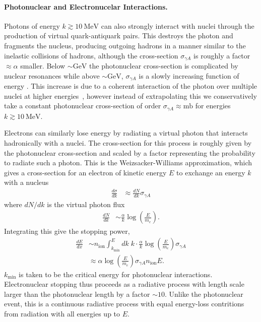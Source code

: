 \documentclass[twocolumn, preprintnumbers,amsmath,amssymb,prd, superscriptaddress]{revtex4}
\newcommand{\GeV}{\text{GeV}}
\def\r{\right)}
\def\l{\left(}
\begin{document}
\begin{appendices}
\paragraph{Photonuclear and Electronucelar Interactions.}
Photons of energy $k \gtrsim 10 ~\text{MeV}$ can also strongly interact with nuclei through the production of virtual quark-antiquark pairs.
This destroys the photon and fragments the nucleus, producing outgoing hadrons in a manner similar to the inelastic collisions of hadrons, although the cross-section $\sigma_{\gamma A}$ is roughly a factor $\approx \alpha$ smaller.
Below $\sim \GeV$ the photonuclear cross-section is complicated by nuclear resonances while above $\sim \GeV$, $\sigma_{\gamma A}$ is a slowly increasing function of energy \cite{Tavernier}.
This increase is due to a coherent interaction of the photon over multiple nuclei at higher energies~\cite{Gerhardt:2010bj}, however instead of extrapolating this we conservatively take a constant photonuclear cross-section of order $\sigma_{\gamma A} \approx \text{mb}$ for energies $k \gtrsim 10 ~\text{MeV}$.

Electrons can similarly lose energy by radiating a virtual photon that interacts hadronically with a nuclei.
The cross-section for this process is roughly given by the photonuclear cross-section and scaled by a factor representing the probability to radiate such a photon.
This is the Weizsacker-Williams approximation, which gives a cross-section for an electron of kinetic energy $E$ to exchange an energy $k$ with a nucleus
\begin{align}
    \frac{d\sigma}{dk} &\approx \frac{dN}{dk} \sigma_{\gamma A}
\end{align}
where $dN/dk$ is the virtual photon flux \cite{Gerhardt:2010bj}
\begin{align}
    \frac{dN}{dk} &\sim \frac{\alpha}{k} \log\l \frac{E}{m_e} \r.
\end{align}
Integrating this give the stopping power,
\begin{align}
    \frac{dE}{dx} &\sim n_\text{ion} \int_{k_\text{min}}^E dk \;
    k \cdot \frac{\alpha}{k} \log\l \frac{E}{m_e} \r  \sigma_{\gamma A} \\
    &\approx \alpha \log\l \frac{E}{m_e} \r \sigma_{\gamma A} n_\text{ion} E.
\end{align}
$k_\text{min}$ is taken to be the critical energy for photonuclear interactions.
Electronuclear stopping thus proceeds as a radiative process with length scale larger than the photonuclear length by a factor $\sim 10$.
Unlike the photonuclear event, this is a continuous radiative process with equal energy-loss contritions from radiation with all energies up to $E$.


\end{appendices}
\end{document}
